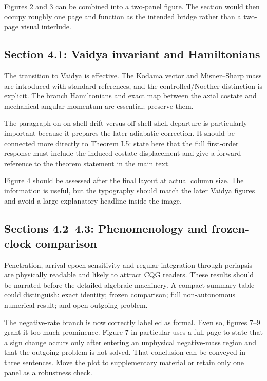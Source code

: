 \documentclass[11pt,a4paper]{article}
\begin{document}
Figures 2 and 3 can be combined into a two-panel figure.  The section would then occupy roughly one
page and function as the intended bridge rather than a two-page visual interlude.

\subsection{Section 4.1: Vaidya invariant and Hamiltonians}

The transition to Vaidya is effective.  The Kodama vector and Misner--Sharp mass are introduced with
standard references, and the controlled/Noether distinction is explicit.  The branch Hamiltonians
and exact map between the axial costate and mechanical angular momentum are essential; preserve
them.

The paragraph on on-shell drift versus off-shell shell departure is particularly important because
it prepares the later adiabatic correction.  It should be connected more directly to Theorem I.5:
state here that the full first-order response must include the induced costate displacement and
give a forward reference to the theorem statement in the main text.

Figure 4 should be assessed after the final layout at actual column size.  The information is
useful, but the typography should match the later Vaidya figures and avoid a large explanatory
headline inside the image.

\subsection{Sections 4.2--4.3: Phenomenology and frozen-clock comparison}

Penetration, arrival-epoch sensitivity and regular integration through periapsis are physically
readable and likely to attract CQG readers.  These results should be narrated before the detailed
algebraic machinery.  A compact summary table could distinguish: exact identity; frozen
comparison; full non-autonomous numerical result; and open outgoing problem.

The negative-rate branch is now correctly labelled as formal.  Even so, figures 7--9 grant it too
much prominence.  Figure 7 in particular uses a full page to state that a sign change occurs only
after entering an unphysical negative-mass region and that the outgoing problem is not solved.
That conclusion can be conveyed in three sentences.  Move the plot to supplementary material or
retain only one panel as a robustness check.
\end{document}
